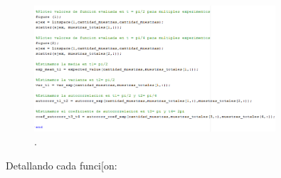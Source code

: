 \begin{figure}[H]
\centering
	\includegraphics[width=0.8\textwidth, trim = {0 0 0 0},clip]{./ImagenesEjercicio1/main2.png}
	\caption{.}
	\label{fig:main2}
\end{figure}

Detallando cada funci[on:
